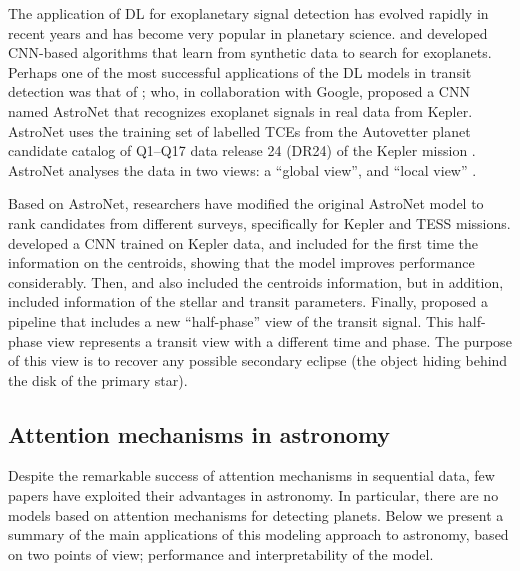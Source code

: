 The application of DL for exoplanetary signal detection has evolved rapidly in recent years and has become very popular in planetary science.  \citet{pearson2018} and \citet{zucker2018shallow} developed CNN-based algorithms that learn from synthetic data to search for exoplanets. Perhaps one of the most successful applications of the DL models in transit detection was that of \citet{Shallue_2018}; who, in collaboration with Google, proposed a CNN named AstroNet that recognizes exoplanet signals in real data from Kepler. AstroNet uses the training set of labelled TCEs from the Autovetter planet candidate catalog of Q1–Q17 data release 24 (DR24) of the Kepler mission \citep{catanzarite2015autovetter}. AstroNet analyses the data in two views: a ``global view'', and ``local view'' \citep{Shallue_2018}. \par




Based on AstroNet, researchers have modified the original AstroNet model to rank candidates from different surveys, specifically for Kepler and TESS missions. \citet{ansdell2018scientific} developed a CNN trained on Kepler data, and included for the first time the information on the centroids, showing that the model improves performance considerably. Then, \citet{osborn2020rapid} and \citet{yu2019identifying} also included the centroids information, but in addition, \citet{osborn2020rapid} included information of the stellar and transit parameters. Finally, \citet{rao2021nigraha} proposed a pipeline that includes a new ``half-phase'' view of the transit signal. This half-phase view represents a transit view with a different time and phase. The purpose of this view is to recover any possible secondary eclipse (the object hiding behind the disk of the primary star).


%



\subsection{Attention mechanisms in astronomy}
\label{sec:relatedwork_attention}
Despite the remarkable success of attention mechanisms in sequential data, few papers have exploited their advantages in astronomy. In particular, there are no models based on attention mechanisms for detecting planets. Below we present a summary of the main applications of this modeling approach to astronomy, based on two points of view; performance and interpretability of the model.\par

